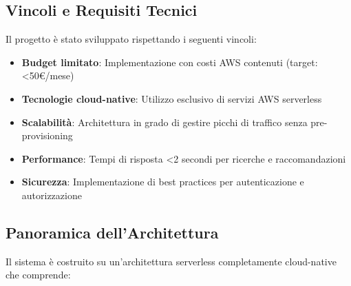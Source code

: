 \documentclass[11pt,a4paper]{article}
\begin{document}
\subsection{Vincoli e Requisiti Tecnici}
Il progetto è stato sviluppato rispettando i seguenti vincoli:
\begin{itemize}
  \item \textbf{Budget limitato}: Implementazione con costi AWS contenuti (target: <50€/mese)
  \item \textbf{Tecnologie cloud-native}: Utilizzo esclusivo di servizi AWS serverless
  \item \textbf{Scalabilità}: Architettura in grado di gestire picchi di traffico senza pre-provisioning
  \item \textbf{Performance}: Tempi di risposta <2 secondi per ricerche e raccomandazioni
  \item \textbf{Sicurezza}: Implementazione di best practices per autenticazione e autorizzazione
\end{itemize}

\subsection{Panoramica dell'Architettura}
Il sistema è costruito su un'architettura serverless completamente cloud-native che comprende:
\end{document}
